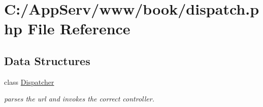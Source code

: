 \hypertarget{dispatch_8php}{
\section{C:/AppServ/www/book/dispatch.php File Reference}
\label{dispatch_8php}
}
\subsection*{Data Structures}
\begin{DoxyCompactItemize}
\item 
class \hyperlink{class_dispatcher}{Dispatcher}
\begin{DoxyCompactList}\small\item\em parses the url and invokes the correct controller. \item\end{DoxyCompactList}\end{DoxyCompactItemize}
